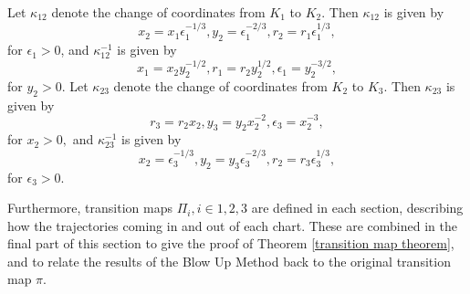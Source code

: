 \begin{lemma} \label{coord. change}
Let $\kappa_{12}$ denote the change of coordinates from $K_1$ to $K_2$. Then $\kappa_{12}$ is given by \\
\begin{equation*}
x_2 = x_1 \epsilon_1^{-1/3},  y_2 = \epsilon_1^{-2/3}, r_2= r_1\epsilon_1^{1/3},
\end{equation*}
for $\epsilon_1 >0$,
and $\kappa_{12}^{-1}$ is given by
\begin{equation*}
x_1 = x_2y_2^{-1/2}, r_1 = r_2 y_2^{1/2}, \epsilon_1= y_2^{-3/2},
\end{equation*}
for $y_2>0$.
Let $\kappa_{23}$ denote the change of coordinates from $K_2$ to $K_3$. Then $\kappa_{23}$ is given by
\begin{equation*}
r_3 = r_2x_2, y_3= y_2x_2^{-2}, \epsilon_3 = x_2^{-3}, \label{eq:kappa23}
\end{equation*}
for $x_2>0,$
and $\kappa_{23}^{-1}$  is given by
\begin{equation*}
x_2 = \epsilon_3^{-1/3}, y_2 = y_3\epsilon_3^{-2/3}, r_2= r_3 \epsilon_3^{1/3},
\end{equation*}
for $\epsilon_3>0$.
\end{lemma}

Furthermore, transition maps $\Pi_i, i \in 1,2,3$  are defined in each section, describing how the trajectories coming in and out of each chart. These are combined in the final part of this section to give the proof of Theorem \ref{transition map theorem}, and to relate the results of the Blow Up Method back to the original transition map $\pi$.
